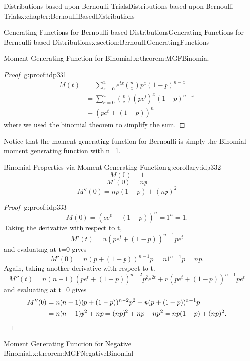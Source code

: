\documentclass[oneside,10pt,]{book}
\newcommand{\qedhere}{\relax}
\numberwithin{equation}{section}
\begin{document}
\begin{chapterptx}{Distributions based upon Bernoulli Trials}{}{Distributions based upon Bernoulli Trials}{}{}{x:chapter:BernoulliBasedDistributions}
\begin{sectionptx}{Generating Functions for Bernoulli-based Distributions}{}{Generating Functions for Bernoulli-based Distributions}{}{}{x:section:BernoulliGeneratingFunctions}
\begin{theorem}{Moment Generating Function for Binomial.}{}{x:theorem:MGFBinomial}
%
\end{theorem}
\begin{proof}{}{g:proof:idp331}
%
\begin{align*}
M(t) & = \sum_{x=0}^n e^{tx} \binom{n}{x} p^x (1-p)^{n-x} \\
& = \sum_{x=0}^n \binom{n}{x} (pe^t)^x (1-p)^{n-x} \\
& = \left ( p e^t + (1-p) \right )^n
\end{align*}
where we used the binomial theorem to simplify the sum.%
\end{proof}
Notice that the moment generating function for Bernoulli is simply the Binomial moment generating function with n=1.%
\begin{corollary}{Binomial Properties via Moment Generating Function.}{}{g:corollary:idp332}%
%
\begin{equation*}
M(0) = 1
\end{equation*}
%
\begin{equation*}
M'(0) = np
\end{equation*}
%
\begin{equation*}
M''(0) = np(1-p) + (np)^2
\end{equation*}
%
\end{corollary}
\begin{proof}{}{g:proof:idp333}
%
\begin{equation*}
M(0) = \left ( p e^0 + (1-p) \right )^n = 1^n = 1.
\end{equation*}
Taking the derivative with respect to t,%
\begin{equation*}
M'(t) = n \left ( p e^t + (1-p) \right )^{n-1} p e^t
\end{equation*}
and evaluating at t=0 gives%
\begin{equation*}
M'(0) = n \left ( p + (1-p) \right )^{n-1} p = n 1^{n-1} p = np.
\end{equation*}
Again, taking another derivative with respect to t,%
\begin{equation*}
M''(t) = n(n-1) \left ( p e^t + (1-p) \right )^{n-2} p^2 e^{2t} + n \left ( p e^t + (1-p) \right )^{n-1} p e^t 
\end{equation*}
and evaluating at t=0 gives%
\begin{align*}
M''(0) & = n(n-1) ( p + (1-p))^{n-2} p^2 + n ( p + (1-p)  )^{n-1} p \\
& = n(n-1)p^2 + np = (np)^2 + np - np^2 = np(1-p) + (np)^2.\qedhere
\end{align*}
%
\end{proof}
\begin{theorem}{Moment Generating Function for Negative Binomial.}{}{x:theorem:MGFNegativeBinomial}%

\end{theorem}
\end{sectionptx}
\end{chapterptx}
\end{document}
